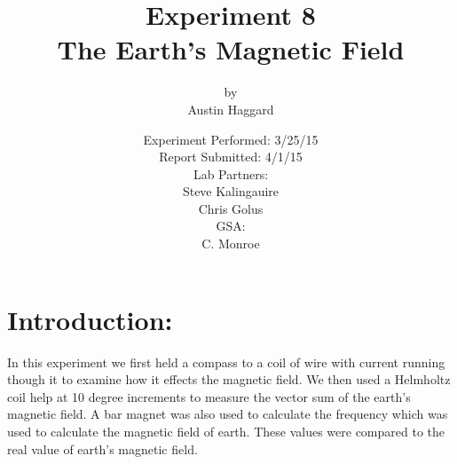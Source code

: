 \documentclass{article}
\title{Experiment 8 \\ The Earth's Magnetic Field}
\author{by \\ Austin Haggard}
\date{
	Experiment Performed: 3/25/15 \\
	Report Submitted: 4/1/15 \\[11pt]
	Lab Partners: \\ Steve Kalingauire \\ Chris Golus \\[11pt] 
	GSA: \\ C. Monroe
}
\begin{document}
\maketitle
\thispagestyle{empty}
\newpage

\section*{Introduction:}
\setcounter{page}{1}
In this experiment we first held a compass to a coil of wire with current running though it to examine how it effects the magnetic field.  We then used a Helmholtz coil help at 10 degree increments to measure the vector sum of the earth's magnetic field.  A bar magnet was also used to calculate the frequency which was used to calculate the magnetic field of earth.  These values were compared to the real value of earth's magnetic field.
\newpage

\end{document}
